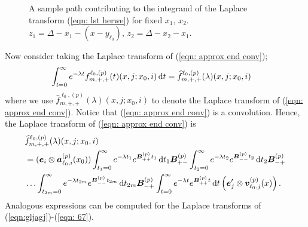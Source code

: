 \begin{figure}
    \centering{}
    \caption{\label{fig: sample paths lst} A sample path contributing to the integrand of the Laplace transform (\ref{eqn: lst herwe}) for fixed \(x_1,\, x_2\). \(z_1 = \Delta - x_1-(x-y_{\ell_0}),\, z_2= \Delta - x_2-x_1\).}
\end{figure}

Now consider taking the Laplace transform of (\ref{eqn: approx end conv});
\begin{align}
	\int_{t=0}^\infty e^{-\lambda t} f^{\ell_0,(p)}_{m,+,+}(t)(  x, j; x_0,i) \, \mathrm{d} t  
	&= \widehat f^{\ell_0,(p)}_{m,+,+}(\lambda)( x, j; x_0,i) \label{eqn: fpapPP2}
\end{align}
where we use \(\widehat f^{\ell_0,(p)}_{m,+,+}(\lambda)(  x, j; x_0,i) \) to denote the Laplace transform of (\ref{eqn: approx end conv}). Notice that (\ref{eqn: approx end conv}) is a convolution. Hence, the Laplace transform of (\ref{eqn: approx end conv}) is
\begin{align}
	&\widehat f^{\ell_0,(p)}_{m,+,+}(\lambda)(x, j; x_0,i) \nonumber 
	\\&=(\boldsymbol e_i\otimes \boldsymbol  a_{\ell_0,i}^{(p)}(x_0))  \int_{t_1=0}^\infty e^{-\lambda t_1} e^{\boldsymbol{B}^{(p)}_{++}t_1} \, \mathrm{d} t_1 \boldsymbol{B}^{(p)}_{+{-}} \nonumber
	\int_{t_2=0}^\infty e^{-\lambda t_2} e^{\boldsymbol{B}^{(p)}_{--}t_2} \, \mathrm{d} t_2\boldsymbol{B}^{(p)}_{-{+}} 
	\\&\hdots 
	\int_{t_{2m}=0}^\infty e^{-\lambda t_{2m}}e^{\boldsymbol{B}^{(p)}_{--}t_{2m}} \, \mathrm{d} t_{2m}\boldsymbol{B}^{(p)}_{-{+}} 
	\int_{t=0}^\infty e^{-\lambda t}e^{\boldsymbol{B}^{(p)}_{++}t} \, \mathrm{d} t 
	\left(\boldsymbol e_j'{} \otimes {\boldsymbol v}_{\ell_0,j}^{(p)}(x)\right). \label{eqn: approx end conv lst}
\end{align}
Analogous expressions can be computed for the Laplace transforms of (\ref{eqn:gljagj})-(\ref{eqn: 67}). 

